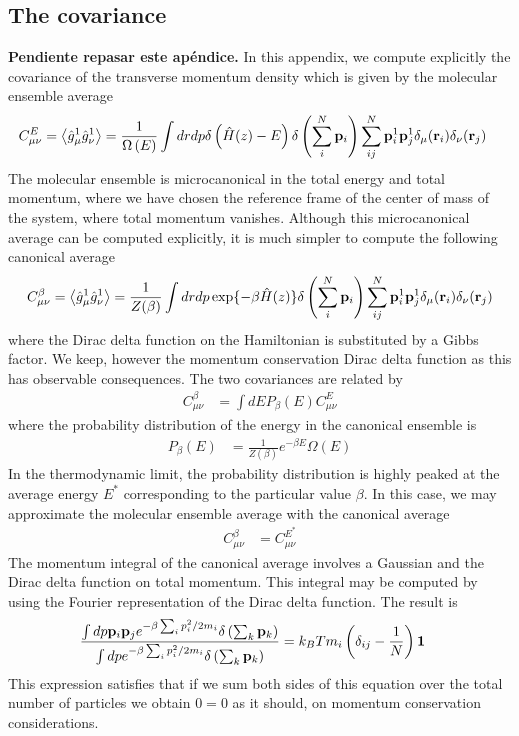 \documentclass[b5paper,openright,11pt]{book}
\newcommand{\Note}[1]{{\bf \color{red}#1}}    %
\newcommand{\llangle}{\left\langle}
\newcommand{\rrangle}{\right\rangle}
\begin{document}
\begin{appendices}
\chapter{The covariance}
\label{Ap:Cov}
\Note{Pendiente repasar este apéndice.}
In  this  appendix,  we  compute   explicitly  the  covariance  of  the
transverse momentum density  which is given by  the molecular ensemble
average
\begin{align}
  C_{\mu\nu}^E&=\llangle \hat{g}_\mu^1\hat{g}_\nu^1\rrangle
=\frac{1}{\Omega\left(E\right)}
\int dr dp \delta\left(\hat{H}(z)-E\right)
\delta\left(\sum_i^N{\bf p}_i\right) 
\sum_{ij}^N{\bf p}_i^1{\bf p}_j^1\delta_{\mu}({\bf r}_i) 
\delta_{\nu}({\bf r}_j) 
\end{align}
The molecular ensemble is microcanonical in the total energy and total
momentum, where  we have chosen the  reference frame of the  center of
mass  of the  system, where  total momentum  vanishes.  Although  this
microcanonical average can be computed  explicitly, it is much simpler
to compute the following canonical average
\begin{align}
  C_{\mu\nu}^\beta =\llangle \hat{g}_\mu^1\hat{g}_\nu^1\rrangle
=\frac{1}{Z(\beta)}
\int dr dp \exp\{-\beta\hat{H}(z)\}
\delta\left(\sum_i^N{\bf p}_i\right) 
\sum_{ij}^N{\bf p}_i^1{\bf p}_j^1\delta_{\mu}({\bf r}_i) 
\delta_{\nu}({\bf r}_j) 
\end{align}
where the Dirac delta function on  the Hamiltonian is substituted by a
Gibbs factor. We  keep, however the momentum  conservation Dirac delta
function as this has observable consequences.  The two covariances are
related by
\begin{align}
  C^{\beta}_{\mu\nu}&=\int dE P_\beta(E)
  C^{E}_{\mu\nu}
\end{align}
where the probability distribution of the energy in the canonical ensemble is
\begin{align}
P_\beta(E)&=  \frac{1}{Z(\beta)}e^{-\beta E}\Omega(E)
\end{align}
In the thermodynamic limit, the probability distribution is highly peaked
at the average energy $E^*$ corresponding to the particular value $\beta$. In this case, we may approximate the molecular
ensemble average with the canonical average
\begin{align}
  C^{\beta}_{\mu\nu}&=  C^{E^*}_{\mu\nu}
\end{align}
The momentum integral of the canonical average involves a Gaussian and the
Dirac delta function on total momentum. This integral may be computed by
using the Fourier representation of the Dirac delta function. The result
is
\begin{align}
  \frac{\int dp {\bf p}_i{\bf p}_je^{-\beta\sum_ip_i^2/2m_i}
\delta\left(\sum_k{\bf p}_k\right)}{\int dp e^{-\beta\sum_ip_i^2/2m_i}
\delta\left(\sum_k{\bf p}_k\right)}&=k_BT m_i\left(\delta_{ij}-\frac{1}{N}\right){\bf 1}
\label{momint}\end{align}
This expression satisfies  that if we sum both sides  of this equation
over the  total number of particles  we obtain $0=0$ as  it should, on
momentum conservation considerations.


\end{appendices}
\end{document}
